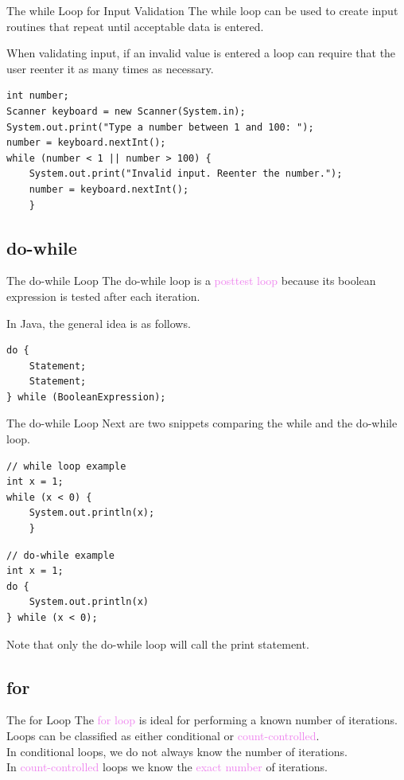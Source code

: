 \documentclass[11pt]{beamer}
\newcommand{\violet}[1]{\textcolor{violet}{#1}}
\begin{document}
\begin{frame}[fragile]{The while Loop for Input Validation}
    The while loop can be used to create input routines that repeat until acceptable data is entered.

    When validating input, if an invalid value is entered a loop can require that the user reenter it as many times as necessary.
    \begin{lstlisting}
int number;
Scanner keyboard = new Scanner(System.in);
System.out.print("Type a number between 1 and 100: ");
number = keyboard.nextInt();
while (number < 1 || number > 100) {
    System.out.print("Invalid input. Reenter the number.");
    number = keyboard.nextInt();
    }
    \end{lstlisting}
\end{frame}

\subsection{do-while}
\begin{frame}[fragile]{The do-while Loop}
    The do-while loop is a \violet{posttest loop} because its boolean expression is tested after each iteration.

    In Java, the general idea is as follows.
    \begin{lstlisting}
do {
    Statement;
    Statement;
} while (BooleanExpression);
    \end{lstlisting}
\end{frame}

\begin{frame}[fragile]{The do-while Loop}
    Next are two snippets comparing the while and the do-while loop.
    \begin{lstlisting}
// while loop example
int x = 1;
while (x < 0) {
    System.out.println(x);
    }
    \end{lstlisting}

    \begin{lstlisting}
// do-while example
int x = 1;
do {
    System.out.println(x)
} while (x < 0);
    \end{lstlisting}

    Note that only the do-while loop will call the print statement.
\end{frame}

\subsection{for}
\begin{frame}{The for Loop}
    The \violet{for loop} is ideal for performing a known number of iterations. \\
    \vspace{1em}
    Loops can be classified as either conditional or \violet{count-controlled}. \\ 
    \vspace{1em}
    In conditional loops, we do not always know the number of iterations. \\ 
    \vspace{1em}
    In \violet{count-controlled} loops we know the \violet{exact number} of iterations.
\end{frame}
\end{document}

